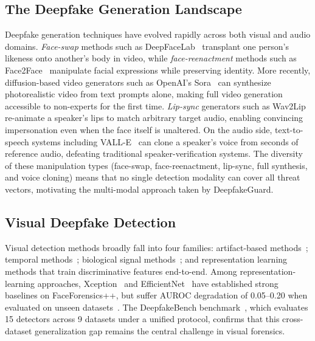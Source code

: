 \documentclass[conference]{IEEEtran}
\begin{document}
\subsection{The Deepfake Generation Landscape}
Deepfake generation techniques have evolved rapidly across both visual and audio domains. \emph{Face-swap} methods such as DeepFaceLab~\cite{deepfacelab} transplant one person's likeness onto another's body in video, while \emph{face-reenactment} methods such as Face2Face~\cite{thies2016face2face} manipulate facial expressions while preserving identity. More recently, diffusion-based video generators such as OpenAI's Sora~\cite{sora2024} can synthesize photorealistic video from text prompts alone, making full video generation accessible to non-experts for the first time. \emph{Lip-sync} generators such as Wav2Lip~\cite{prajwal2020wav2lip} re-animate a speaker's lips to match arbitrary target audio, enabling convincing impersonation even when the face itself is unaltered. On the audio side, text-to-speech systems including VALL-E~\cite{valle} can clone a speaker's voice from seconds of reference audio, defeating traditional speaker-verification systems. The diversity of these manipulation types (face-swap, face-reenactment, lip-sync, full synthesis, and voice cloning) means that no single detection modality can cover all threat vectors, motivating the multi-modal approach taken by DeepfakeGuard.

\subsection{Visual Deepfake Detection}
Visual detection methods broadly fall into four families: artifact-based methods~\cite{face_artifacts}; temporal methods~\cite{temporal_detection}; biological signal methods~\cite{biological_signals}; and representation learning methods that train discriminative features end-to-end. Among representation-learning approaches, Xception~\cite{rossler2019faceforensics} and EfficientNet~\cite{efficientnet} have established strong baselines on FaceForensics++, but suffer AUROC degradation of 0.05--0.20 when evaluated on unseen datasets~\cite{celebdf}. The DeepfakeBench benchmark~\cite{yan2023deepfakebench}, which evaluates 15 detectors across 9 datasets under a unified protocol, confirms that this cross-dataset generalization gap remains the central challenge in visual forensics.
\end{document}
